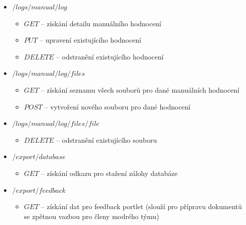 \documentclass[
  digital,
  twoside,
  table, 
  nolof, 
  nolot
]{fithesis3}
\begin{document}
\begin{itemize}
    \item $/logs/manual/{log}$
    \begin{itemize}
        \item $GET$ -- získání detailu manuálního hodnocení
        \item $PUT$ -- upravení existujícího hodnocení
        \item $DELETE$ -- odstranění existujícího hodnocení
    \end{itemize}
            
    \item $/logs/manual/{log}/files$
    \begin{itemize}
        \item $GET$ -- získání seznamu všech souborů pro dané manuálních hodnocení
        \item $POST$ -- vytvoření nového souboru pro dané hodnocení
    \end{itemize}
            
    \item $/logs/manual/{log}/files/{file}$
    \begin{itemize}
        \item $DELETE$ -- odstranění existujícího souboru
    \end{itemize}
            
    \item $/export/database$
    \begin{itemize}
        \item $GET$ -- získání odkazu pro stažení zálohy databáze
    \end{itemize}
                
    \item $/export/feedback$
    \begin{itemize}
        \item $GET$ -- získání dat pro feedback portlet (slouží pro přípravu dokumentů se zpětnou vazbou pro členy modrého týmu)
    \end{itemize}

\end{itemize}
\end{document}
